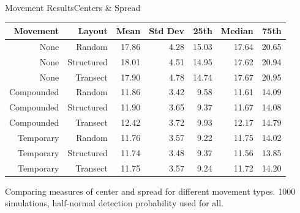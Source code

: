 \documentclass{beamer}
\begin{document}
\begin{frame}{Movement Results}{Centers \& Spread}

	\begin{table}
	
		\begin{tabular}{ r r| r r| r r r}
			Movement  & Layout     & Mean  & Std Dev & 25th  & Median & 75th  \\ \hline\hline
			None      & Random     & 17.86 & 4.28    & 15.03 & 17.64  & 20.65 \\
			None      & Structured & 18.01 & 4.51    & 14.95 & 17.62  & 20.94 \\
			None      & Transect   & 17.90 & 4.78    & 14.74 & 17.67  & 20.95 \\ \hline
			Compounded & Random     & 11.86 & 3.42    & 9.58  & 11.61  & 14.09 \\
			Compounded & Structured & 11.90 & 3.65    & 9.37  & 11.67  & 14.08 \\
			Compounded & Transect   & 12.42 & 3.72    & 9.93  & 12.17  & 14.79 \\ \hline
			Temporary & Random     & 11.76 & 3.57    & 9.22  & 11.75  & 14.02 \\
			Temporary & Structured & 11.74 & 3.48    & 9.37  & 11.56  & 13.85 \\
			Temporary & Transect   & 11.75 & 3.57    & 9.24  & 11.72  & 14.20
		\end{tabular}
	\small
	Comparing measures of center and spread for different movement types. 1000 simulations, half-normal detection probability used for all.
	\end{table}
\end{frame}
\end{document}

